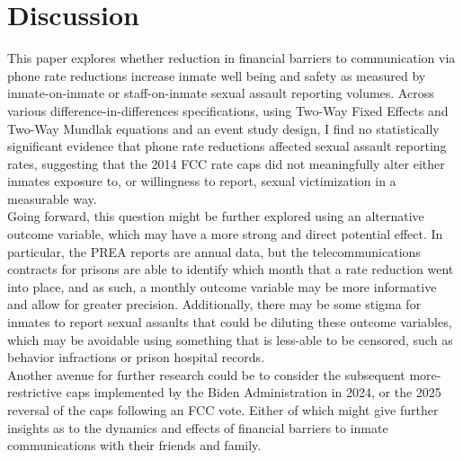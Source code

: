 \begin{table}
	\begin{center}
		
		\caption[Staff-on-Inmate Sexual Misconduct Allegation Estimates]{This table follows the form of table \ref{table_inmate_noncon_all}, but considers a staff-on-inmate outcome. Across various specifications, I find null treatment effect results for the effect of the phone rate drops on Staff-on-Inmate Sexual Misconduct Allegations.}
		\label{table_staff_miscond_all}
	\end{center}
\end{table}

\section{Discussion}
This paper explores whether reduction in financial barriers to communication via phone rate reductions increase inmate well being and safety as measured by inmate-on-inmate or staff-on-inmate sexual assault reporting volumes. Across various difference-in-differences specifications, using Two-Way Fixed Effects and Two-Way Mundlak equations and an event study design, I find no statistically significant evidence that phone rate reductions affected sexual assault reporting rates, suggesting that the 2014 FCC rate caps did not meaningfully alter either inmates exposure to, or willingness to report, sexual victimization in a measurable way. \\

Going forward, this question might be further explored using an alternative outcome variable, which may have a more strong and direct potential effect. In particular, the PREA reports are annual data, but the telecommunications contracts for prisons are able to identify which month that a rate reduction went into place, and as such, a monthly outcome variable may be more informative and allow for greater precision. Additionally, there may be some stigma for inmates to report sexual assaults that could be diluting these outcome variables, which may be avoidable using something that is less-able to be censored, such as behavior infractions or prison hospital records. \\

Another avenue for further research could be to consider the subsequent more-restrictive caps implemented by the Biden Administration in 2024, or the 2025 reversal of the caps following an FCC vote. Either of which might give further insights as to the dynamics and effects of financial barriers to inmate communications with their friends and family. \\

